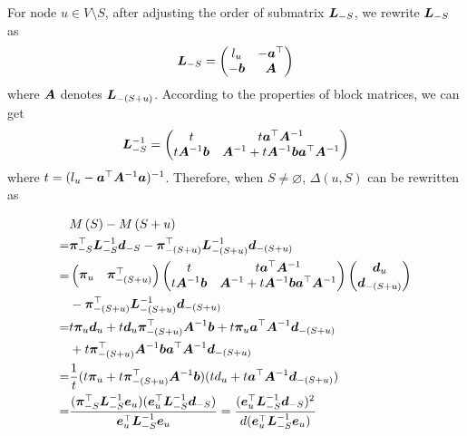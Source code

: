 \documentclass[sigconf]{acmart}
\begin{document}
For node \(u\in V\setminus S\), after adjusting the order of submatrix \(\boldsymbol{L}_{-S}\), we rewrite \(\boldsymbol{L}_{-S}\) as
\[\boldsymbol{L}_{-S}=\begin{pmatrix}l_u & -\boldsymbol{a}^\top \\-\boldsymbol{b}&\boldsymbol{A}\end{pmatrix}\]
where \(\boldsymbol{A}\) denotes \(\boldsymbol{L}_{-(S+u)}\).
According to the properties of block matrices, we can get
\[\boldsymbol{L}_{-S}^{-1}=\begin{pmatrix}
        t & t\boldsymbol{a}^\top\boldsymbol{A}^{-1} \\t\boldsymbol{A}^{-1}\boldsymbol{b}&\boldsymbol{A}^{-1}+t\boldsymbol{A}^{-1}\boldsymbol{b}\boldsymbol{a}^\top\boldsymbol{A}^{-1}
    \end{pmatrix}\]
where \(t=(l_u-\boldsymbol{a}^\top\boldsymbol{A}^{-1}\boldsymbol{a})^{-1}\).
Therefore, when \(S\neq\varnothing\), \(\Delta(u,S)\) can be rewritten as

\begin{equation}\label{eq:margin-deriv}
    \begin{split}
        &M\left(S\right)-M\left(S+u\right)\\
        =&\boldsymbol{\pi}_{-S}^\top\boldsymbol{L}_{-S}^{-1}\boldsymbol{d}_{-S}-\boldsymbol{\pi}_{-(S+u)}^\top\boldsymbol{L}_{-(S+u)}^{-1}\boldsymbol{d}_{-(S+u)}\\
        =&\begin{pmatrix}\boldsymbol{\pi}_u&\boldsymbol{\pi}_{-(S+u)}^\top\end{pmatrix}\begin{pmatrix}t & t\boldsymbol{a}^\top\boldsymbol{A}^{-1} \\t\boldsymbol{A}^{-1}\boldsymbol{b}&\boldsymbol{A}^{-1}+t\boldsymbol{A}^{-1}\boldsymbol{b}\boldsymbol{a}^\top\boldsymbol{A}^{-1}\end{pmatrix}\begin{pmatrix}\boldsymbol{d}_u\\\boldsymbol{d}_{-(S+u)}\end{pmatrix}\\
        &-\boldsymbol{\pi}_{-(S+u)}^\top\boldsymbol{L}_{-(S+u)}^{-1}\boldsymbol{d}_{-(S+u)}\\
        =&t\boldsymbol{\pi}_u\boldsymbol{d}_u+t\boldsymbol{d}_u\boldsymbol{\pi}_{-(S+u)}^\top\boldsymbol{A}^{-1}\boldsymbol{b}+t\boldsymbol{\pi}_u\boldsymbol{a}^\top\boldsymbol{A}^{-1}\boldsymbol{d}_{-(S+u)}\\
        &+t\boldsymbol{\pi}_{-(S+u)}^\top\boldsymbol{A}^{-1}\boldsymbol{b}\boldsymbol{a}^\top\boldsymbol{A}^{-1}\boldsymbol{d}_{-(S+u)}\\
        =&\frac1t(t\boldsymbol{\pi}_u+t\boldsymbol{\pi}_{-(S+u)}^\top\boldsymbol{A}^{-1}\boldsymbol{b})(td_u+t\boldsymbol{a}^\top\boldsymbol{A}^{-1}\boldsymbol{d}_{-(S+u)})\\
        =&\frac{(\boldsymbol{\pi}_{-S}^\top\boldsymbol{L}_{-S}^{-1}\boldsymbol{e}_u)(\boldsymbol{e}_u^\top\boldsymbol{L}_{-S}^{-1}\boldsymbol{d}_{-S})}{\boldsymbol{e}_u^\top\boldsymbol{L}_{-S}^{-1}\boldsymbol{e}_u}=\frac{(\boldsymbol{e}_u^\top\boldsymbol{L}_{-S}^{-1}\boldsymbol{d}_{-S})^2}{d(\boldsymbol{e}_u^\top\boldsymbol{L}_{-S}^{-1}\boldsymbol{e}_u)}
    \end{split}
\end{equation}
\end{document}
